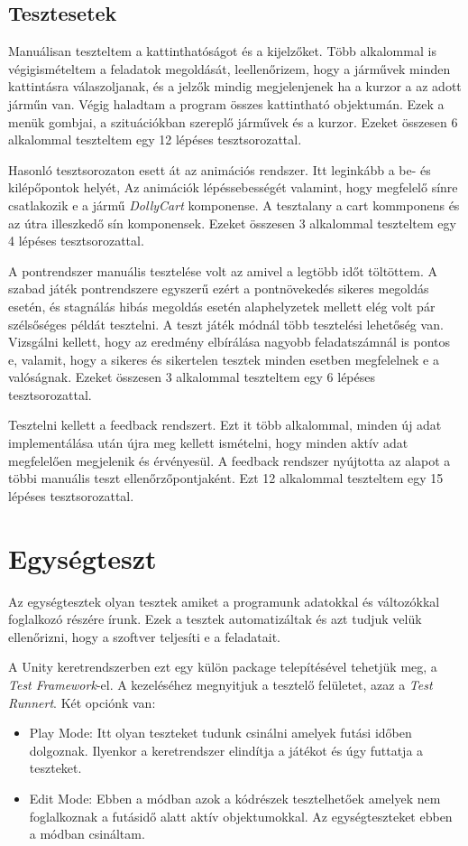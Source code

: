 \documentclass[
]{thesis-ekf}
\theoremstyle{definition}
\theoremstyle{remark}
\begin{document}
\subsection{Tesztesetek}
Manuálisan teszteltem a kattinthatóságot és a kijelzőket. Több alkalommal is végigismételtem a feladatok megoldását, leellenőrizem, hogy a járművek minden kattintásra válaszoljanak, és a jelzők mindig megjelenjenek ha a kurzor a az adott járműn van. Végig haladtam a program összes kattintható objektumán. Ezek a menük gombjai, a szituációkban szereplő járművek és a kurzor. Ezeket összesen 6 alkalommal teszteltem egy 12 lépéses tesztsorozattal.

Hasonló tesztsorozaton esett át az animációs rendszer. Itt leginkább a be- és kilépőpontok helyét, Az animációk lépéssebességét valamint, hogy megfelelő sínre csatlakozik e a jármű \textit{DollyCart} komponense. A tesztalany a cart kommponens és az útra illeszkedő sín komponensek. Ezeket összesen 3 alkalommal teszteltem egy 4 lépéses tesztsorozattal.

A pontrendszer manuális tesztelése volt az amivel a legtöbb időt töltöttem. A szabad játék pontrendszere egyszerű ezért a pontnövekedés sikeres megoldás esetén, és stagnálás hibás megoldás esetén alaphelyzetek mellett elég volt pár szélsőséges példát tesztelni. A teszt játék módnál több tesztelési lehetőség van. Vizsgálni kellett, hogy az eredmény elbírálása nagyobb feladatszámnál is pontos e, valamit, hogy a sikeres és sikertelen tesztek minden esetben megfelelnek e a valóságnak. Ezeket összesen 3 alkalommal teszteltem egy 6 lépéses tesztsorozattal.

Tesztelni kellett a feedback rendszert. Ezt it több alkalommal, minden új adat implementálása után újra meg kellett ismételni, hogy minden aktív adat megfelelően megjelenik és érvényesül. A feedback rendszer nyújtotta az alapot a többi manuális teszt ellenőrzőpontjaként. Ezt 12 alkalommal teszteltem egy 15 lépéses tesztsorozattal.

\section{Egységteszt}
Az egységtesztek olyan tesztek amiket a programunk adatokkal és változókkal foglalkozó részére írunk. Ezek a tesztek automatizáltak és azt tudjuk velük ellenőrizni, hogy a szoftver teljesíti e a feladatait.

A Unity keretrendszerben ezt egy külön package telepítésével tehetjük meg, a \textit{Test Framework}-el. A kezeléséhez megnyitjuk a tesztelő felületet, azaz a \textit{Test Runnert}. Két opciónk van:
\begin{itemize}
	\item Play Mode: Itt olyan teszteket tudunk csinálni amelyek futási időben dolgoznak. Ilyenkor a keretrendszer elindítja a játékot és úgy futtatja a teszteket.
	\item Edit Mode: Ebben a módban azok a kódrészek tesztelhetőek amelyek nem foglalkoznak a futásidő alatt aktív objektumokkal. Az egységteszteket ebben a módban csináltam.
\end{itemize}
\end{document}
